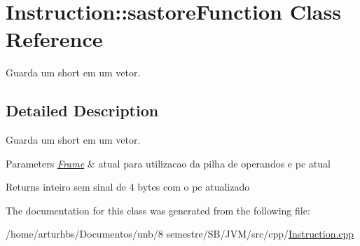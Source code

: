 \hypertarget{classInstruction_1_1sastoreFunction}{}\section{Instruction\+:\+:sastore\+Function Class Reference}
\label{classInstruction_1_1sastoreFunction}


Guarda um short em um vetor.  




\subsection{Detailed Description}
Guarda um short em um vetor. 


\begin{DoxyParams}{Parameters}
{\em \hyperlink{classFrame}{Frame}} & atual para utilizacao da pilha de operandos e pc atual \\
\hline
\end{DoxyParams}
\begin{DoxyReturn}{Returns}
inteiro sem sinal de 4 bytes com o pc atualizado 
\end{DoxyReturn}


The documentation for this class was generated from the following file\+:\begin{DoxyCompactItemize}
\item 
/home/arturhbs/\+Documentos/unb/8 semestre/\+S\+B/\+J\+V\+M/src/cpp/\hyperlink{Instruction_8cpp}{Instruction.\+cpp}\end{DoxyCompactItemize}
